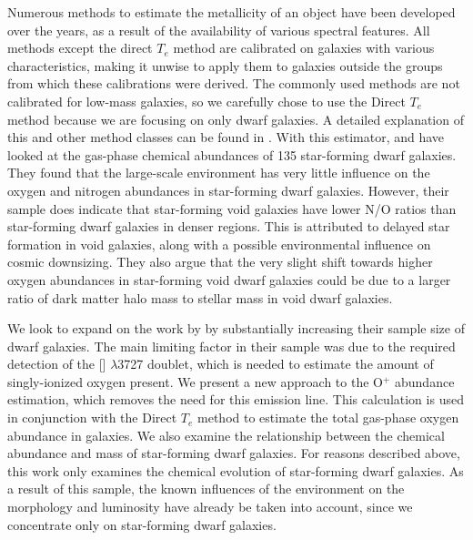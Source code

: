 Numerous methods to estimate the metallicity of an object have been developed 
over the years, as a result of the availability of various spectral features.  
All methods except the direct $T_e$ method are calibrated on galaxies with 
various characteristics, making it unwise to apply them to galaxies outside the 
groups from which these calibrations were derived.  The commonly used methods 
are not calibrated for low-mass galaxies, so we carefully chose to use the 
Direct $T_e$ method because we are focusing on only dwarf galaxies.  A detailed 
explanation of this and other method classes can be found in \cite{Douglass17a}.  
With this estimator, \cite{Douglass17a} and \cite{Douglass17b} have looked at 
the gas-phase chemical abundances of 135 star-forming dwarf galaxies.  They 
found that the large-scale environment has very little influence on the oxygen 
and nitrogen abundances in star-forming dwarf galaxies.  However, their sample 
does indicate that star-forming void galaxies have lower N/O ratios than 
star-forming dwarf galaxies in denser regions.  This is attributed to delayed 
star formation in void galaxies, along with a possible environmental influence 
on cosmic downsizing.  They also argue that the very slight shift towards higher 
oxygen abundances in star-forming void dwarf galaxies could be due to a larger 
ratio of dark matter halo mass to stellar mass in void dwarf galaxies.

We look to expand on the work by \cite{Douglass17a,Douglass17b} by substantially 
increasing their sample size of dwarf galaxies.  The main limiting factor in 
their sample was due to the required detection of the [] $\lambda$3727 
doublet, which is needed to estimate the amount of singly-ionized oxygen 
present.  We present a new approach to the O$^+$ abundance estimation, which 
removes the need for this emission line.  This calculation is used in 
conjunction with the Direct $T_e$ method to estimate the total gas-phase oxygen 
abundance in galaxies.  We also examine the relationship between the chemical 
abundance and  mass of star-forming dwarf galaxies.  For reasons 
described above, this work only examines the chemical evolution of star-forming 
dwarf galaxies.  As a result of this sample, the known influences of the 
environment on the morphology and luminosity have already be taken into account, 
since we concentrate only on star-forming dwarf galaxies.

